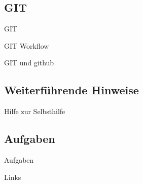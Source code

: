 \documentclass[18pt]{beamer}
\begin{document}
\subsection{GIT}
\begin{frame}{GIT}
\end{frame}

\begin{frame}{GIT Workflow}
\end{frame}

\begin{frame}{GIT und github}
\end{frame}

\subsection{Weiterführende Hinweise}
\begin{frame}{Hilfe zur Selbsthilfe}
\end{frame}

\subsection{Aufgaben}
\begin{frame}{Aufgaben}
\end{frame}

\appendix
\beginbackup

\begin{frame}[allowframebreaks]{Links}
\end{frame}

\backupend
\end{document}
